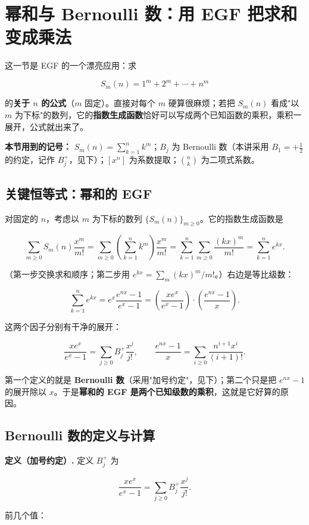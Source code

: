 \section{幂和与 Bernoulli 数：用 EGF 把求和变成乘法}


这一节是 EGF 的一个漂亮应用：求

\[
S_m(n)=1^m+2^m+\cdots+n^m
\]

的\textbf{关于 $n$ 的公式}（$m$ 固定）。直接对每个 $m$ 硬算很麻烦；若把 $S_m(n)$ 看成"以 $m$ 为下标"的数列，它的\textbf{指数生成函数}恰好可以写成两个已知函数的乘积，乘积一展开，公式就出来了。

\textbf{本节用到的记号：} $S_m(n)=\sum_{k=1}^{n}k^m$；$B_j$ 为 Bernoulli 数（本讲采用 $B_1=+\frac12$ 的约定，记作 $B_j^+$，见下）；$[x^n]$ 为系数提取；$\binom nk$ 为二项式系数。

\subsection{关键恒等式：幂和的 EGF}


对固定的 $n$，考虑以 $m$ 为下标的数列 $\{S_m(n)\}_{m\ge0}$。它的指数生成函数是

\[
\sum_{m\ge0}S_m(n)\frac{x^m}{m!}
=\sum_{m\ge0}\left(\sum_{k=1}^{n}k^m\right)\frac{x^m}{m!}
=\sum_{k=1}^{n}\sum_{m\ge0}\frac{(kx)^m}{m!}
=\sum_{k=1}^{n}e^{kx}.
\]

（第一步交换求和顺序；第二步用 $e^{kx}=\sum_m (kx)^m/m!$。）右边是等比级数：

\[
\sum_{k=1}^{n}e^{kx}=e^x\frac{e^{nx}-1}{e^x-1}
=\left(\frac{xe^x}{e^x-1}\right)\cdot\left(\frac{e^{nx}-1}{x}\right).
\]

这两个因子分别有干净的展开：

\[
\frac{xe^x}{e^x-1}=\sum_{j\ge0}B_j^+\frac{x^j}{j!},
\qquad
\frac{e^{nx}-1}{x}=\sum_{i\ge0}\frac{n^{i+1}x^i}{(i+1)!}.
\]

第一个定义的就是 \textbf{Bernoulli 数}（采用"加号约定"，见下）；第二个只是把 $e^{nx}-1$ 的展开除以 $x$。于是\textbf{幂和的 EGF 是两个已知级数的乘积}，这就是它好算的原因。

\subsection{Bernoulli 数的定义与计算}


\textbf{定义（加号约定）.} 定义 $B_j^+$ 为

\[
\frac{xe^x}{e^x-1}=\sum_{j\ge0}B_j^+\frac{x^j}{j!}.
\]

前几个值：

